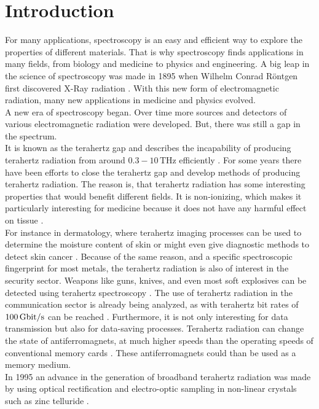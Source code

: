 \chapter{Introduction}
For many applications, spectroscopy is an easy and efficient way to explore the properties of different materials.
That is why spectroscopy finds applications in many fields, from biology and medicine to physics and engineering.
A big leap in the science of spectroscopy was made in 1895 when Wilhelm Conrad Röntgen first discovered X-Ray radiation \cite{roentgen}.
With this new form of electromagnetic radiation, many new applications in medicine and physics evolved.
\\
A new era of spectroscopy began.
Over time more sources and detectors of various electromagnetic radiation were developed.
But, there was still a gap in the spectrum.
\\
It is known as the terahertz gap and describes the incapability of producing terahertz radiation from around $0.3-10\,\si{\tera\hertz}$ efficiently \cite{THzgap_applications}.
For some years there have been efforts to close the terahertz gap and develop methods of producing terahertz radiation.
The reason is, that terahertz radiation has some interesting properties that would benefit different fields.
It is non-ionizing, which makes it particularly interesting for medicine because it does not have any harmful effect on tissue \cite{THzgap_applications}.
\\
For instance in dermatology, where terahertz imaging processes can be used to determine the moisture content of skin or might even give diagnostic methods to detect skin cancer \cite{terahertz_dermatology}. 
Because of the same reason, and a specific spectroscopic fingerprint for most metals, the terahertz radiation is also of interest in the security sector.
Weapons like guns, knives, and even most soft explosives can be detected using terahertz spectroscopy \cite{THzgap_applications, thz_explosive_detec}.
The use of terahertz radiation in the communication sector is already being analyzed, as with terahertz bit rates of $\SI{100}{\giga\bit\per\second}$ can be reached \cite{communication}.
Furthermore, it is not only interesting for data transmission but also for data-saving processes.
Terahertz radiation can change the state of antiferromagnets, at much higher speeds than the operating speeds of conventional memory cards \cite{datasaving}.
These antiferromagnets could than be used as a memory medium.
\\
In 1995 an advance in the generation of broadband terahertz radiation was made by using optical rectification and electro-optic sampling in non-linear crystals such as zinc telluride \cite{first_eos_wu_zhang, ZnTe_Nahata_Weling_1996}.
